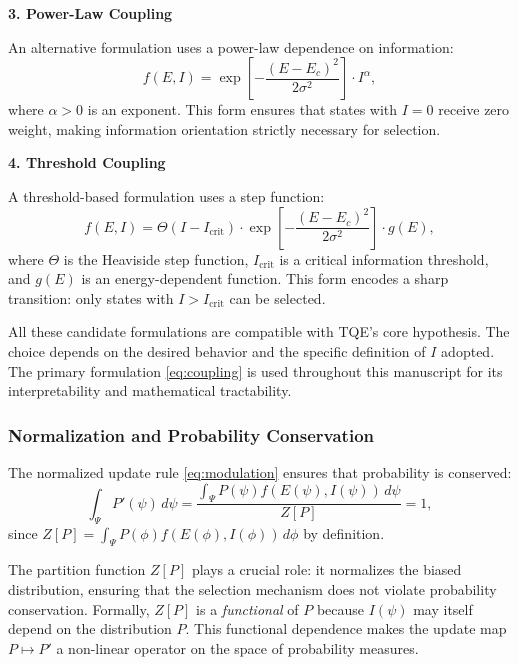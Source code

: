 \documentclass[12pt,a4paper]{article}
\theoremstyle{definition}
\theoremstyle{remark}
\begin{document}
\textbf{3. Power-Law Coupling}

An alternative formulation uses a power-law dependence on information:
\begin{equation}
f(E,I) = \exp\left[-\frac{(E - E_c)^2}{2\sigma^2}\right] \cdot I^\alpha,
\end{equation}
where $\alpha > 0$ is an exponent. This form ensures that states with $I = 0$ receive zero weight, making information orientation strictly necessary for selection.

\textbf{4. Threshold Coupling}

A threshold-based formulation uses a step function:
\begin{equation}
f(E,I) = \Theta(I - I_{\text{crit}}) \cdot \exp\left[-\frac{(E - E_c)^2}{2\sigma^2}\right] \cdot g(E),
\end{equation}
where $\Theta$ is the Heaviside step function, $I_{\text{crit}}$ is a critical information threshold, and $g(E)$ is an energy-dependent function. This form encodes a sharp transition: only states with $I > I_{\text{crit}}$ can be selected.

All these candidate formulations are compatible with TQE's core hypothesis. The choice depends on the desired behavior and the specific definition of $I$ adopted. The primary formulation \eqref{eq:coupling} is used throughout this manuscript for its interpretability and mathematical tractability.

\subsubsection{Normalization and Probability Conservation}

The normalized update rule \eqref{eq:modulation} ensures that probability is conserved:
\begin{equation}
\int_\Psi P'(\psi) \, d\psi = \frac{\int_\Psi P(\psi) f(E(\psi), I(\psi)) \, d\psi}{Z[P]} = 1,
\end{equation}
since $Z[P] = \int_\Psi P(\phi) f(E(\phi), I(\phi)) \, d\phi$ by definition.

The partition function $Z[P]$ plays a crucial role: it normalizes the biased distribution, ensuring that the selection mechanism does not violate probability conservation. Formally, $Z[P]$ is a \emph{functional} of $P$ because $I(\psi)$ may itself depend on the distribution $P$. This functional dependence makes the update map $P \mapsto P'$ a non-linear operator on the space of probability measures.
\end{document}
